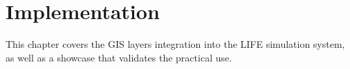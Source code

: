 
% 
\chapter{Implementation}
\label{sec:implementation}
This chapter covers the GIS layers integration into the LIFE simulation system, as well as a showcase that validates the practical use.



%
%
%
%



